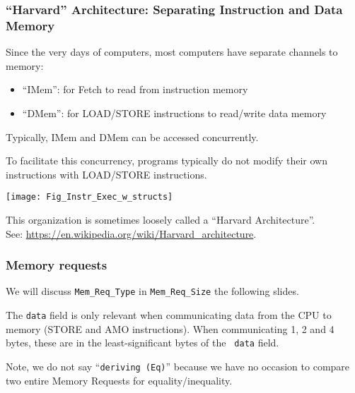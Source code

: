 \begin{frame}[fragile]
\frametitle{``Harvard'' Architecture: Separating Instruction and Data Memory}

\footnotesize

\begin{minipage}{0.35\textwidth}

 Since the very days of computers, most computers have separate channels to memory:

 \begin{itemize}

  \item ``IMem'': for Fetch to read from instruction memory

  \item ``DMem'': for LOAD/STORE instructions to read/write data memory

 \end{itemize}

 Typically, IMem and DMem can be accessed concurrently.

To facilitate this concurrency, programs typically do not modify their
 own instructions with LOAD/STORE instructions.

\end{minipage}
\hm
\begin{minipage}{0.6\textwidth}

 \begin{center}
  \texttt{[image: Fig\_Instr\_Exec\_w\_structs]}
 \end{center}

\end{minipage}

\vfill

This organization is sometimes loosely called a ``Harvard Architecture''. \\
See: \hm \url{https://en.wikipedia.org/wiki/Harvard_architecture}.

\end{frame}


\begin{frame}[fragile]
\frametitle{Memory requests}

\footnotesize


\vspace{2ex}

We will discuss {\tt Mem\_Req\_Type} in {\tt Mem\_Req\_Size} the following slides.

\vspace{1ex}

The {\tt data} field is only relevant when communicating data from the
CPU to memory (STORE and AMO instructions).  When communicating 1, 2
and 4 bytes, these are in the least-significant bytes of the {\tt
data} field.

\PAUSE{\vspace{4ex}}

Note, we do not say ``{\tt deriving (Eq)}'' because we have no
occasion to compare two entire Memory Requests for
equality/inequality.

\end{frame}

